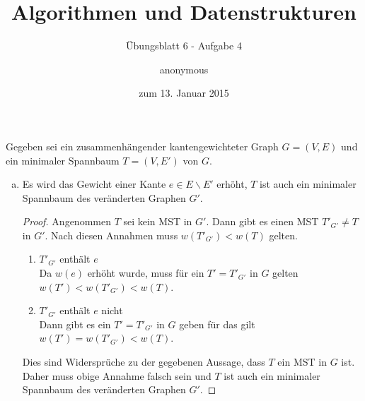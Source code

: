 \documentclass[a4paper]{scrartcl}
\title{Algorithmen und Datenstrukturen}
\subtitle{Übungsblatt 6 - Aufgabe 4}
\author{
    anonymous
}
\date{zum 13. Januar 2015}
\begin{document}
\maketitle

Gegeben sei ein zusammenhängender kantengewichteter Graph $G = (V, E)$ und ein
minimaler Spannbaum $T = (V, E')$ von $G$.

\begin{enumerate}[(a)]
    \item
        \begin{behaupt}
            Es wird das Gewicht einer Kante $e \in E \backslash E'$ erhöht,
            $T$ ist auch ein minimaler Spannbaum des veränderten Graphen $G'$.
        \end{behaupt}
        \begin{proof}
            Angenommen $T$ sei kein MST in $G'$.
            Dann gibt es einen MST $T'_{G'} \neq T$ in $G'$.
            Nach diesen Annahmen muss $w(T'_{G'}) < w(T)$ gelten.
            \begin{enumerate}
                \item $T'_{G'}$ enthält $e$ \\
                    Da $w(e)$ erhöht wurde, muss für ein $T' = T'_{G'}$ in $G$ gelten
                    $w(T') < w(T'_{G'}) < w(T)$.

                \item $T'_{G'}$ enthält $e$ nicht \\
                    Dann gibt es ein $T' = T'_{G'}$ in $G$ geben für das gilt
                    $w(T') = w(T'_{G'}) < w(T)$.
            \end{enumerate}
            Dies sind Widersprüche zu der gegebenen Aussage, dass $T$ ein MST
            in $G$ ist.
            Daher muss obige Annahme falsch sein und $T$ ist auch ein minimaler
            Spannbaum des veränderten Graphen $G'$.
        \end{proof}


\end{enumerate}
\end{document}

